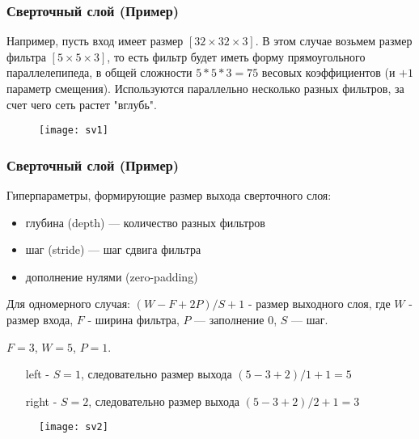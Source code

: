 \documentclass[unicode, notheorems]{beamer}
\begin{document}
\begin{frame}
	\frametitle{Сверточный слой (Пример)}
	Например, пусть вход имеет размер $[32 \times 32 \times 3]$. В этом случае возьмем размер фильтра  $[5 \times 5 \times 3]$, то есть фильтр будет иметь форму прямоугольного параллелепипеда, в общей сложности $5 * 5 * 3 = 75$ весовых коэффициентов (и $+1$ параметр смещения). Используются параллельно несколько разных фильтров, за счет чего сеть растет "вглубь".
		\begin{figure}[h]
			\begin{center}
				\begin{minipage}[h]{0.9\linewidth}
					\texttt{[image: sv1]}
				\end{minipage}
			\end{center}
		\end{figure}

\end{frame}

\begin{frame}
	\frametitle{Сверточный слой (Пример)}
	Гиперпараметры, формирующие размер выхода сверточного слоя:
	 \begin{itemize}
	 	\item глубина (depth) --- количество разных фильтров
	 	\item шаг (stride) --- шаг сдвига фильтра
	 	\item дополнение нулями (zero-padding)
	 \end{itemize}

	 Для одномерного случая: $(W-F+2P)/S+1$ - размер выходного слоя, где $W$ - размер входа, $F$ - ширина фильтра, $P$ --- заполнение $0$, $S$ --- шаг.

	 $F = 3$, $W = 5$, $P = 1$.
	 \begin{itemize}
	 	\item[left] - $S = 1$, следовательно размер выхода $(5 - 3 + 2) / 1 + 1 = 5$
	 	\item[right] - $S = 2$, следовательно размер выхода $(5 - 3 + 2) / 2 + 1 = 3$
	 \end{itemize}
	 \begin{figure}[h]
			\begin{center}
				\begin{minipage}[h]{0.9\linewidth}
					\texttt{[image: sv2]}
				\end{minipage}
			\end{center}
		\end{figure}
\end{frame}
\end{document}

